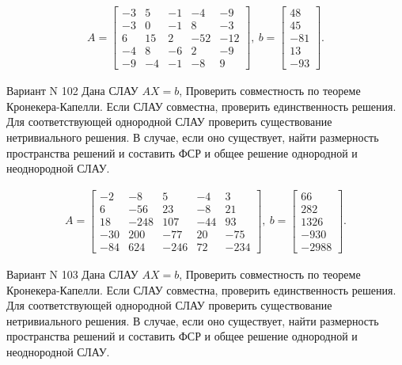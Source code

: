 \documentclass[11pt]{report}
\begin{document}
\begin{align*}
 A = \left[\begin{matrix}-3 & 5 & -1 & -4 & -9\\-3 & 0 & -1 & 8 & -3\\6 & 15 & 2 & -52 & -12\\-4 & 8 & -6 & 2 & -9\\-9 & -4 & -1 & -8 & 9\end{matrix}\right],
\ b = \left[\begin{matrix}48\\45\\-81\\13\\-93\end{matrix}\right]. 
 \end{align*}

Вариант N 102
Дана СЛАУ $AX = b$,
Проверить совместность по теореме Кронекера-Капелли. Если СЛАУ совместна, проверить единственность решения.
Для соответствующей однородной СЛАУ проверить существование нетривиального решения. В случае, если оно существует,
найти размерность пространства решений и составить ФСР и общее решение однородной  и неоднородной СЛАУ.


\begin{align*}
 A = \left[\begin{matrix}-2 & -8 & 5 & -4 & 3\\6 & -56 & 23 & -8 & 21\\18 & -248 & 107 & -44 & 93\\-30 & 200 & -77 & 20 & -75\\-84 & 624 & -246 & 72 & -234\end{matrix}\right],
\ b = \left[\begin{matrix}66\\282\\1326\\-930\\-2988\end{matrix}\right]. 
 \end{align*}

Вариант N 103
Дана СЛАУ $AX = b$,
Проверить совместность по теореме Кронекера-Капелли. Если СЛАУ совместна, проверить единственность решения.
Для соответствующей однородной СЛАУ проверить существование нетривиального решения. В случае, если оно существует,
найти размерность пространства решений и составить ФСР и общее решение однородной  и неоднородной СЛАУ.
\end{document}
